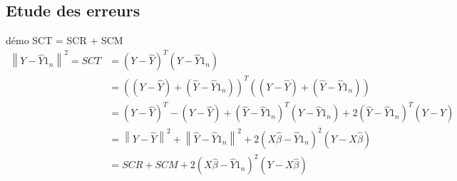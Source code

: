 \documentclass{article}
\theoremstyle{plain}%
\theoremstyle{definition}
\theoremstyle{remark}
\begin{document}
\subsection{Etude des erreurs}
démo SCT = SCR + SCM
\begin{align*}
    \left\| Y - \hat{Y}1_{n} \right\|^2 = SCT &= (Y - \hat{Y})^T (Y - \hat{Y} 1_{n} )\\
    &= ( (Y - \hat{Y}) + (\hat{Y} - \hat{Y} 1_{n}))^T ( (Y - \hat{Y}) + (\hat{Y} - \hat{Y} 1_{n} )) \\
    &= (Y - \hat{Y})^T - (Y-\hat{Y}) + (\hat{Y} - \hat{Y} 1_{n})^T (\hat{Y} - \hat{Y}1_{n}) + 2 (\hat{Y} - \hat{Y}1_{n})^T (Y - \hat{Y}) \\
    &= \left\| Y - \hat{Y} \right\| ^2 + \left\| \hat{Y} - \hat{Y} 1_{n} \right\| ^2 + 2 ( X \hat{\beta } - \hat{Y} 1_{n})^2 (Y - X \hat{\beta }) \\
    &= SCR + SCM + 2 ( X \hat{\beta } - \hat{Y} 1_{n})^2 (Y - X \hat{\beta })
\end{align*}
\end{document}

